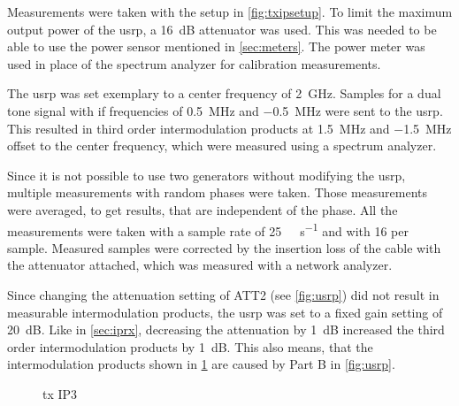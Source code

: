 \documentclass[12pt,a4paper,parskip=full,abstracton]{scrartcl}
\begin{document}
Measurements were taken with the setup in \cref{fig:txipsetup}. To limit the maximum output
power of the \gls{usrp}, a \SI{16}{\deci\bel} attenuator was used. This was needed to be
able to use the power sensor mentioned in \cref{sec:meters}. The power meter was used in
place of the spectrum analyzer for calibration measurements.

The \gls{usrp} was set exemplary to a center frequency of \SI{2}{\giga\hertz}. Samples for a dual
tone signal with \gls{if} frequencies of \SI{+0.5}{\mega\hertz} and \SI{-0.5}{\mega\hertz}
were sent to the \gls{usrp}. This resulted in third order intermodulation products at
\SI{+1.5}{\mega\hertz} and \SI{-1.5}{\mega\hertz} offset to the center frequency, which
were measured using a spectrum analyzer.

Since it is not possible to use two generators without modifying the \gls{usrp}, multiple
measurements with random phases were taken. Those measurements were averaged, to get results,
that are independent of the phase. All the measurements were taken with a sample rate of \SI{25}{\mega\samples\per\second}
and with \SI{16}{\bit} per sample. Measured samples were corrected by the insertion loss of the cable with the
attenuator attached, which was measured with a network analyzer.

Since changing the attenuation setting of ATT2 (see \cref{fig:usrp}) did not result in
measurable intermodulation products, the \gls{usrp} was set to a fixed gain setting of
\SI{20}{\deci\bel}. Like in \cref{sec:iprx}, decreasing the attenuation by 
\SI{1}{\deci\bel} increased the third order intermodulation products by
\SI{1}{\deci\bel}. This also means, that the intermodulation products
shown in \cref{fig:txip3} are caused by Part B in \cref{fig:usrp}.

\begin{figure}[htb]
    \centering
{}
    \caption{\gls{tx} IP3}
    \label{fig:txip3}
\end{figure}
\end{document}
